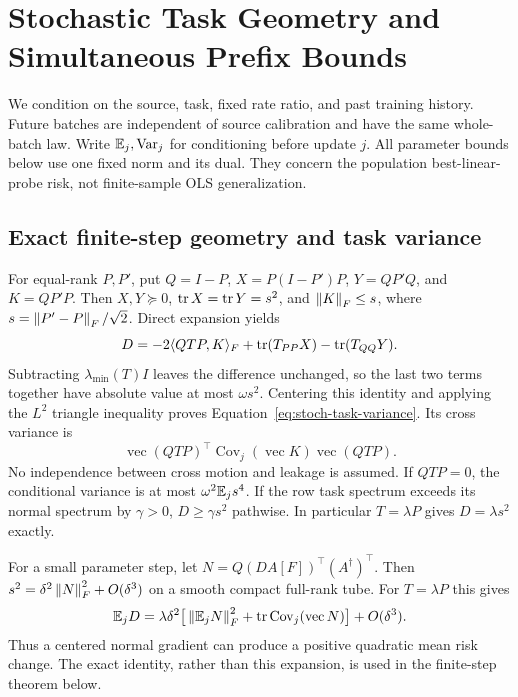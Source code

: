 \section{Stochastic Task Geometry and Simultaneous Prefix Bounds}
\label{app:task-stochastic}
We condition on the source, task, fixed rate ratio, and past training history. Future batches are independent of source calibration and have the same whole-batch law. Write $\mathbb E_j,\operatorname{Var}_j$ for conditioning before update $j$. All parameter bounds below use one fixed norm and its dual. They concern the population best-linear-probe risk, not finite-sample OLS generalization.

\subsection{Exact finite-step geometry and task variance}
For equal-rank $P,P'$, put $Q=I-P$, $X=P(I-P')P$, $Y=QP'Q$, and $K=QP'P$. Then $X,Y\succeq0$, $\operatorname{tr} X=\operatorname{tr} Y=s^2$, and $\left\lVert K\right\rVert_F\le s$, where $s=\left\lVert P'-P\right\rVert_F/\sqrt2$. Direct expansion yields
\begin{equation}
 D=-2\langle QTP,K\rangle_F
      +\operatorname{tr}(T_{PP}X)-\operatorname{tr}(T_{QQ}Y).
\end{equation}
Subtracting $\lambda_{\min}(T)I$ leaves the difference unchanged, so the last two terms together have absolute value at most $\omega s^2$. Centering this identity and applying the $L^2$ triangle inequality proves Equation~\eqref{eq:stoch-task-variance}. Its cross variance is
\begin{equation}
 \operatorname{vec}(QTP)^\top
 \operatorname{Cov}_j(\operatorname{vec}K)
 \operatorname{vec}(QTP).
\end{equation}
No independence between cross motion and leakage is assumed. If $QTP=0$, the conditional variance is at most $\omega^2\mathbb E_js^4$. If the row task spectrum exceeds its normal spectrum by $\gamma>0$, $D\ge\gamma s^2$ pathwise. In particular $T=\lambda P$ gives $D=\lambda s^2$ exactly.

For a small parameter step, let $N=Q(DA[F])^\top(A^\dagger)^\top$. Then $s^2=\delta^2\left\lVert N\right\rVert_F^2+O(\delta^3)$ on a smooth compact full-rank tube. For $T=\lambda P$ this gives
\begin{align}
 \mathbb E_jD=\lambda\delta^2\big[\left\lVert \mathbb E_jN\right\rVert_F^2
 +\operatorname{tr}\operatorname{Cov}_j(\operatorname{vec}N)\big]+O(\delta^3).
\end{align}
Thus a centered normal gradient can produce a positive quadratic mean risk change. The exact identity, rather than this expansion, is used in the finite-step theorem below.

